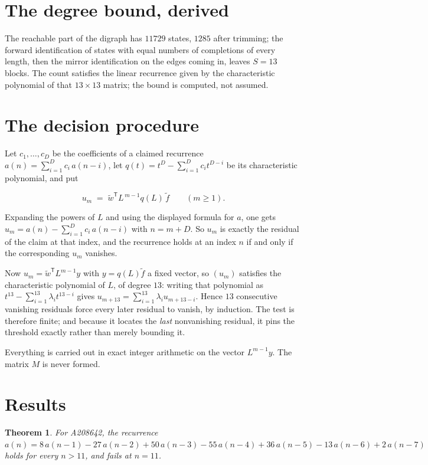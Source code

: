 \documentclass[11pt]{article}
\newtheorem{theorem}{Theorem}
\theoremstyle{definition}
\begin{document}
\section{The degree bound, derived}

The reachable part of the digraph has $11729$ states, $1285$ after trimming; the forward identification of states with equal numbers of completions of every length, then the mirror identification on the edges coming in, leaves $S = 13$ blocks. The count satisfies the linear recurrence given by the characteristic polynomial of that $13\times13$ matrix; the bound is computed, not assumed.

\section{The decision procedure}

Let $c_1,\dots,c_D$ be the coefficients of a claimed recurrence $a(n) = \sum_{i=1}^{D} c_i\,a(n-i)$, let $q(t) = t^{D} - \sum_{i=1}^{D} c_i t^{D-i}$ be its characteristic polynomial, and put

\[u_m \;=\; \tilde w^{\mathsf T} L^{\,m-1} q(L)\,\tilde f \qquad (m \ge 1).\]

Expanding the powers of $L$ and using the displayed formula for $a$, one gets $u_m = a(n) - \sum_{i=1}^{D} c_i\,a(n-i)$ with $n = m + D$. So $u_m$ is exactly the residual of the claim at that index, and the recurrence holds at an index $n$ if and only if the corresponding $u_m$ vanishes.

Now $u_m = \tilde w^{\mathsf T} L^{m-1} y$ with $y = q(L)\tilde f$ a fixed vector, so $(u_m)$ satisfies the characteristic polynomial of $L$, of degree $13$: writing that polynomial as $t^{13} - \sum_{i=1}^{13} \lambda_i t^{13-i}$ gives $u_{m+13} = \sum_{i=1}^{13} \lambda_i u_{m+13-i}$. Hence $13$ consecutive vanishing residuals force every later residual to vanish, by induction. The test is therefore finite; and because it locates the {\itshape last} nonvanishing residual, it pins the threshold exactly rather than merely bounding it.

Everything is carried out in exact integer arithmetic on the vector $L^{m-1}y$. The matrix $M$ is never formed.

\section{Results}

\begin{theorem} For A208642, the recurrence $a(n) = 8\,a(n-1) - 27\,a(n-2) + 50\,a(n-3) - 55\,a(n-4) + 36\,a(n-5) - 13\,a(n-6) + 2\,a(n-7)$ holds for every $n > 11$, and fails at $n = 11$.\end{theorem}
\end{document}

